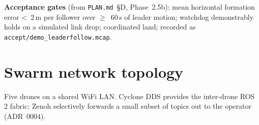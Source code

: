 \documentclass[11pt,a4paper]{article}
\begin{document}
\vspace{0.5em}

\noindent\textbf{Acceptance gates} (from \texttt{PLAN.md}~\S D, Phase~2.5b): mean horizontal
formation error \textless~2\,m per follower over $\geq$~60\,s of leader motion;
watchdog demonstrably holds on a simulated link drop; coordinated land; recorded as
\texttt{accept/demo\_leaderfollow.mcap}.

\newpage

\section{Swarm network topology}

Five drones on a shared WiFi LAN. Cyclone DDS provides the inter-drone
ROS 2 fabric; Zenoh selectively forwards a small subset of topics out
to the operator (ADR~0004).
\end{document}
